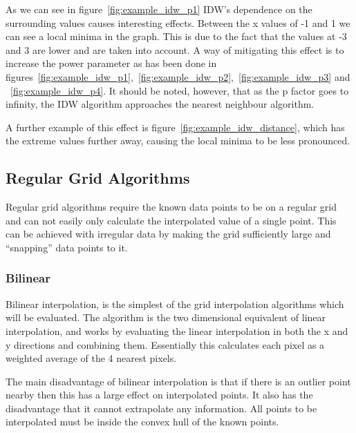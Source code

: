             As we can see in figure~\ref{fig:example_idw_p1} IDW's dependence on the surrounding values causes interesting effects. Between the x values of -1 and 1 we can see a local minima in the graph. This is due to the fact that the values at -3 and 3 are lower and are taken into account. A way of mitigating this effect is to increase the power parameter as has been done in figures~\ref{fig:example_idw_p1},~\ref{fig:example_idw_p2},~\ref{fig:example_idw_p3} and ~\ref{fig:example_idw_p4}. It should be noted, however, that as the p factor goes to infinity, the IDW algorithm approaches the nearest neighbour algorithm. 

            A further example of this effect is figure~\ref{fig:example_idw_distance}, which has the extreme values further away, causing the local minima to be less pronounced.



    \subsection{Regular Grid Algorithms}\label{background_interpolation_methods_regulargrid}

        Regular grid algorithms require the known data points to be on a regular grid and can not easily only calculate the interpolated value of a single point. This can be achieved with irregular data by making the grid sufficiently large and ``snapping'' data points to it.

        \subsubsection{Bilinear}\label{background_interpolation_methods_bilinear}

            Bilinear interpolation, is the simplest of the grid interpolation algorithms which will be evaluated. The algorithm is the two dimensional equivalent of linear interpolation, and works by evaluating the linear interpolation in both the x and y directions and combining them. Essentially this calculates each pixel as a weighted average of the 4 nearest pixels.

            The main disadvantage of bilinear interpolation is that if there is an outlier point nearby then this has a large effect on interpolated points. It also has the disadvantage that it cannot extrapolate any information. All points to be interpolated must be inside the convex hull of the known points.


